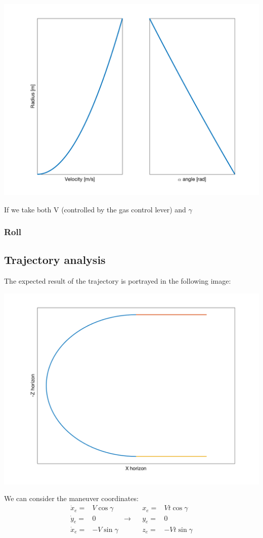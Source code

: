 \begin{center}
	\includegraphics[width=\linewidth]{../matlab/radius.png}
	\vspace{0.5cm}
	\vspace{0.25cm}
\end{center}

If we take both V (controlled by the gas control lever) and $\gamma$ 
\subsubsection*{Roll}

\subsection*{Trajectory analysis} 
The expected result of the trajectory is portrayed in the following image:

\begin{center}
	\includegraphics[width=\linewidth]{../matlab/trajectory.png}
	\vspace{0.5cm}
	\vspace{0.25cm}
\end{center}

We can consider the maneuver coordinates:
\begin{align*}
	\dot{x}_e=&V\cos\gamma&&&	x_e=&Vt\cos\gamma \\
	\dot{y}_e=&0& \rightarrow&&	y_e=&0\\
	\dot{x}_e=&-V\sin\gamma&&&z_e=&-Vt\sin\gamma
\end{align*}